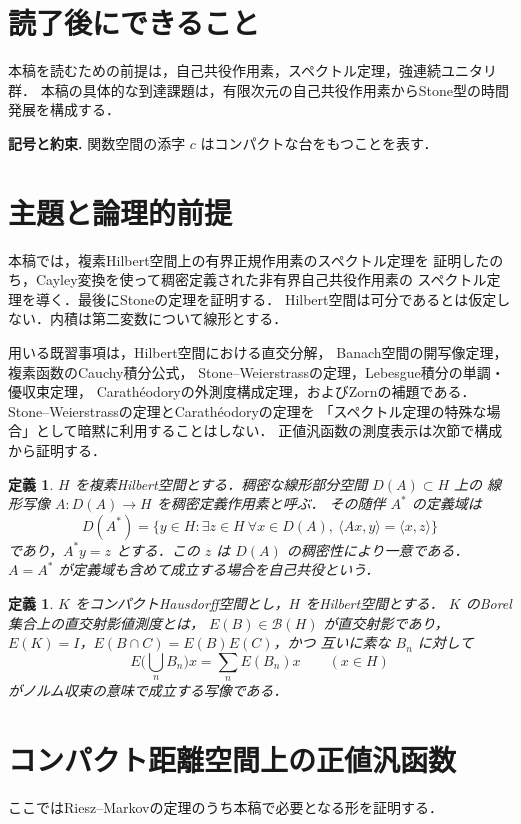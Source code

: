 \documentclass[a5paper,10pt,onecolumn]{jsarticle}
\theoremstyle{mathnotetheorem}
\newtheorem{definition}[theorem]{定義}
\begin{document}
\section*{読了後にできること}
本稿を読むための前提は，自己共役作用素，スペクトル定理，強連続ユニタリ群．
本稿の具体的な到達課題は，有限次元の自己共役作用素からStone型の時間発展を構成する．


\par\noindent\textbf{記号と約束.}\quad
関数空間の添字 $c$ はコンパクトな台をもつことを表す．
\par

\section{主題と論理的前提}
本稿では，複素Hilbert空間上の有界正規作用素のスペクトル定理を
証明したのち，Cayley変換を使って稠密定義された非有界自己共役作用素の
スペクトル定理を導く．最後にStoneの定理を証明する．
Hilbert空間は可分であるとは仮定しない．内積は第二変数について線形とする．

用いる既習事項は，Hilbert空間における直交分解，
Banach空間の開写像定理，複素函数のCauchy積分公式，
Stone--Weierstrassの定理，Lebesgue積分の単調・優収束定理，
Carath\'eodoryの外測度構成定理，およびZornの補題である．
Stone--Weierstrassの定理とCarath\'eodoryの定理を
「スペクトル定理の特殊な場合」として暗黙に利用することはしない．
正値汎函数の測度表示は次節で構成から証明する．

\begin{definition}
$H$ を複素Hilbert空間とする．稠密な線形部分空間 $D(A)\subset H$ 上の
線形写像 $A:D(A)\to H$ を稠密定義作用素と呼ぶ．
その随伴 $A^*$ の定義域は
\[
 D(A^*)=\{y\in H:\exists z\in H\ \forall x\in D(A),
                 \ \langle Ax,y\rangle=\langle x,z\rangle\}
\]
であり，$A^*y=z$ とする．この $z$ は $D(A)$ の稠密性により一意である．
$A=A^*$ が定義域も含めて成立する場合を\emph{自己共役}という．
\end{definition}

\begin{definition}
$K$ をコンパクトHausdorff空間とし，$H$ をHilbert空間とする．
$K$ のBorel集合上の\emph{直交射影値測度}とは，
$E(B)\in\mathcal B(H)$ が直交射影であり，
$E(K)=I$，$E(B\cap C)=E(B)E(C)$，かつ
互いに素な $B_n$ に対して
\[
 E\bigl(\textstyle\bigcup_n B_n\bigr)x
   =\sum_nE(B_n)x \qquad(x\in H)
\]
がノルム収束の意味で成立する写像である．
\end{definition}

\section{コンパクト距離空間上の正値汎函数}
ここではRiesz--Markovの定理のうち本稿で必要となる形を証明する．
\end{document}
